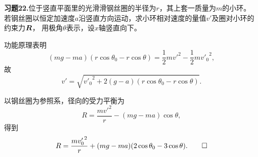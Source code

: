 \textbf{习题22.}位于竖直平面里的光滑滑钢丝圈的半径为$r$，其上套一质量为$m$的小环。
若钢丝圈以恒定加速度$a$沿竖直方向运动，求小环相对速度的量值$v'$及圈对小环的约束力$\boldsymbol{R}$，
用极角$\theta$表示，设$x$轴竖直向下。
\begin{proofc}[解答]
    功能原理表明
    $$(mg-ma)(r\cos\theta_0-r\cos\theta)=\frac{1}{2}mv'^2-\frac{1}{2}m{v'_0}^2,$$
    故
    $$v'=\sqrt{{v'_0}^2+2(g-a)(r\cos\theta_0-r\cos\theta)}.$$
    以钢丝圈为参照系，径向的受力平衡为
    $$R=\frac{mv'^2}{r}-(mg-ma)\cos\theta,$$
    得到
    $$R=\frac{m{v'_0}^2}{r}+(mg-ma)(2\cos\theta_0-3\cos\theta).\qedhere$$
\end{proofc}

